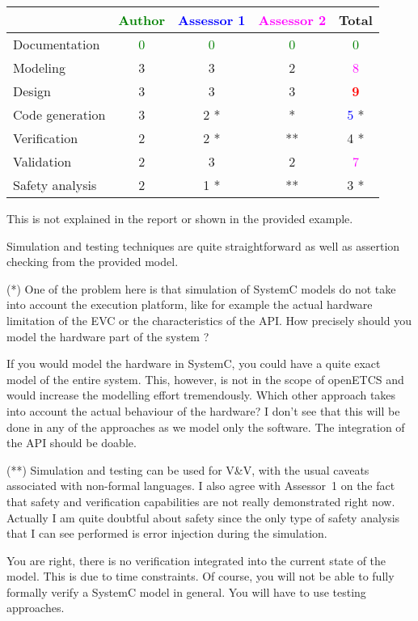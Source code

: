 \begin{tabular}{|l | c | c | c | c|}
\hline
& \textcolor{green}{Author} & \textcolor{blue}{Assessor 1} & \textcolor{magenta}{Assessor 2} & Total \\
\hline
Documentation & \textcolor{green}{0}   & \textcolor{green}{0} & \textcolor{green}{0} & \textcolor{green}{0} \\
\hline
Modeling &3 & 3    & 2    & \textcolor{magenta}{8} \\
\hline
Design &3 &3 & 3    & \textcolor{red}{\textbf{9}} \\
\hline
Code generation &3 & 2    *  & * & \textcolor{blue}{5} * \\
\hline
Verification &2 & 2   * & ** & 4   * \\
\hline
Validation &2 &3 & 2    & \textcolor{magenta}{7} \\
\hline
Safety analysis &2 & 1   * & ** & 3   * \\
\hline
\end{tabular}
\begin{assessor1}
This is not explained in the report or shown in  the provided example.

Simulation and testing techniques are quite straightforward as well as
assertion checking from the provided model.
\end{assessor1}

\begin{assessor2}
  \begin{item}
  \item[(*)] One of the problem here is that simulation of SystemC
    models do not take into account the execution platform, like for
    example the actual hardware limitation of the EVC or the
    characteristics of the API. How precisely should you model the
    hardware part of the system ?
\begin{author_comment}
If you would model the hardware in SystemC, you could have a quite exact model of the entire system. This, however, is not in the scope of openETCS and would increase the modelling effort tremendously. Which other approach takes into account the actual behaviour of the hardware? I don't see that this will be done in any of the approaches as we model only the software. The integration of the API should be doable.
\end{author_comment}
  \item[(**)] Simulation and testing can be used for V\&V, with the
    usual caveats associated with non-formal languages. I also agree
    with Assessor~1 on the fact that safety and verification
    capabilities are not really demonstrated right now. Actually I am
    quite doubtful about safety since the only type of safety analysis
    that I can see performed is error injection during the simulation.
\begin{author_comment}
You are right, there is no verification integrated into the current state of the model. This is due to time constraints. Of course, you will not be able to fully formally verify a SystemC model in general. You will have to use testing approaches.
\end{author_comment}
  \end{item}
\end{assessor2}

